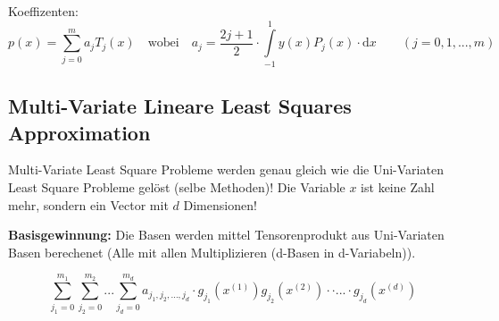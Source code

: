Koeffizenten:
$$
	p(x) = \sum_{j=0}^m a_j T_j(x) \quad \text{wobei} \quad
	a_j = \frac{2j+1}{2} \cdot \int\limits_{-1}^{1}y(x) P_j(x) \cdot \mathrm{d}x \qquad (j=0,1,...,m)
$$

\subsection{Multi-Variate Lineare Least Squares Approximation}
Multi-Variate Least Square Probleme werden genau gleich wie die Uni-Variaten Least Square Probleme gelöst (selbe Methoden)! Die Variable $x$ ist keine Zahl mehr, sondern ein Vector mit $d$ Dimensionen!

\textbf{Basisgewinnung:}
Die Basen werden mittel Tensorenprodukt aus Uni-Variaten Basen berechenet (Alle mit allen Multiplizieren (d-Basen in d-Variabeln)).

\[
	\sum\limits_{j_1=0}^{m_1} \sum\limits_{j_2=0}^{m_2} ... \sum\limits_{j_d=0}^{m_d} a_{j_1,j_2,...,j_d} \cdot g_{j_1}(x^{(1)}) g_{j_2}(x^{(2)}) \cdot \cdot ... \cdot g_{j_d}(x^{(d)})
\]